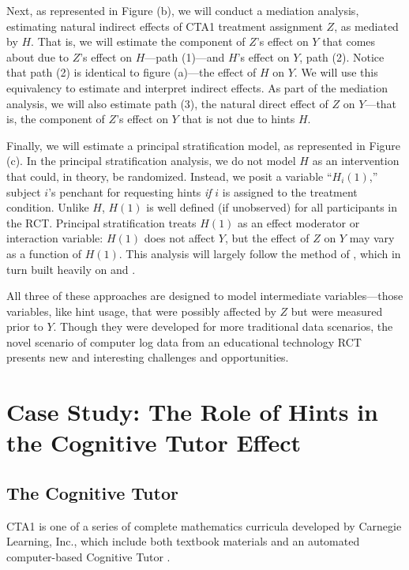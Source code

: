 \documentclass{article}
\begin{document}
Next, as represented in Figure (b), we will conduct a mediation analysis, estimating natural
indirect effects of CTA1 treatment assignment $Z$, as mediated by
$H$. That is, we will estimate the component of $Z$'s effect on $Y$ that comes about
due to $Z$'s effect on $H$---path (1)---and $H$'s effect on $Y$, path
(2).
Notice that path (2) is identical to figure (a)---the effect of $H$ on
$Y$.
We will use this equivalency to estimate and interpret indirect
effects.
As part of the mediation analysis, we will also estimate path (3), the
natural direct effect of $Z$ on $Y$---that is, the component of $Z$'s
effect on $Y$ that is not due to hints $H$.

Finally, we will estimate a principal stratification model, as represented in Figure
(c).
In the principal stratification analysis, we do not model $H$ as an
intervention that could, in theory, be randomized.
Instead, we posit a variable ``$H_i(1)$,''  subject $i$'s penchant for
requesting hints \emph{if} $i$ is assigned to the treatment
condition.
Unlike $H$, $H(1)$ is well defined (if
unobserved) for all participants in the RCT.
Principal stratification treats $H(1)$ as an effect moderator or
interaction variable: $H(1)$ does not affect $Y$, but the effect of
$Z$ on $Y$ may vary as a function of $H(1)$.
This analysis will largely follow the method of \citet{aoas}, which in
turn built heavily on \citet{schwartz2011bayesian} and
\citet{jin2008principal}.

All three of these approaches are designed to model intermediate
variables---those variables, like hint usage,
that were possibly affected by $Z$ but were measured prior to $Y$.
Though they were developed for more traditional data scenarios, the
novel scenario of computer log data from an educational technology RCT
presents new and interesting challenges and opportunities.

\section{Case Study: The Role of Hints in the Cognitive Tutor Effect}

\subsection{The Cognitive Tutor}
CTA1 is one of a series of complete mathematics curricula developed by
Carnegie Learning, Inc., which include both textbook materials and an
automated computer-based Cognitive Tutor
\citep{anderson1995cognitive,pane2014effectiveness}.
\end{document}
